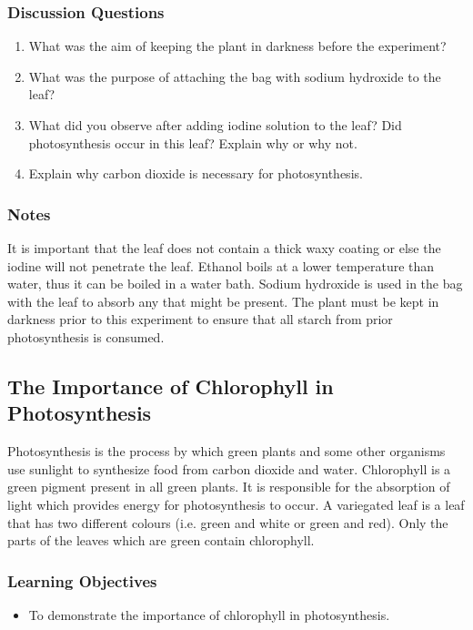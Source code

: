 \subsubsection*{Discussion Questions}
\begin{enumerate}
\item{What was the aim of keeping the plant in darkness before the experiment?}
\item{What was the purpose of attaching the bag with sodium hydroxide to the leaf?}
\item{What did you observe after adding iodine solution to the leaf? Did photosynthesis occur in this leaf? Explain why or why not.}
\item{Explain why carbon dioxide is necessary for photosynthesis.}
\end{enumerate}

\subsubsection*{Notes}
It is important that the leaf does not contain a thick waxy coating or else the iodine will not penetrate the leaf. Ethanol boils at a lower temperature than water, thus it can be boiled in a water bath. Sodium hydroxide is used in the bag with the leaf to absorb any  that might be present. The plant must be kept in darkness prior to this experiment to ensure that all starch from prior photosynthesis is consumed.

\subsection{The Importance of Chlorophyll in Photosynthesis}
Photosynthesis is the process by which green plants and some other organisms use sunlight to synthesize food from carbon dioxide and water. Chlorophyll is a green pigment present in all green plants. It is responsible for the absorption of light which provides energy for photosynthesis to occur. A variegated leaf is a leaf that has two different colours (i.e. green and white or green and red). Only the parts of the leaves which are green contain chlorophyll.

\subsubsection*{Learning Objectives}
\begin{itemize}
\item{To demonstrate the importance of chlorophyll in photosynthesis.}
\end{itemize}

